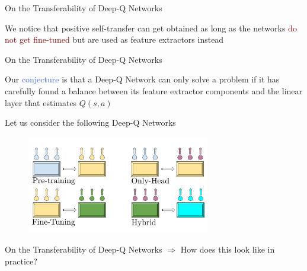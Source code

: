\documentclass{beamer}
\begin{document}
\begin{frame}{On the Transferability of Deep-Q Networks}
	
	We notice that positive self-transfer can get obtained as long as the networks \textcolor{Maroon}{do not get fine-tuned} but are used as feature extractors instead

	\begin{table}[ht!]
	\centering
	\caption{The area ratio scores obtained after performing self-transfer. We can see that if only the last linear layer is trained, then positive transfer is obtained on all \texttt{Catch} environments, whereas if the network is fine-tuned, positive transfer is (in part) only obtained on \texttt{Catch-v2}.}
	
	\label{tab:self_tl_area_ratio}
	\end{table}

\end{frame}

\begin{frame}{On the Transferability of Deep-Q Networks}

	\bigskip
	Our \textcolor{RoyalBlue}{conjecture} is that a Deep-Q Network can only solve a problem if it has carefully found a balance between its feature extractor components and the linear layer that estimates $Q(s,a)$

	\bigskip

	Let us consider the following Deep-Q Networks

	\begin{figure}[ht]
		\centering
		\includegraphics[width=8cm]{./figures/new_networks_2.pdf}
	\end{figure}

\end{frame}


\begin{frame}{On the Transferability of Deep-Q Networks}
	\bigskip
	$\Rightarrow$ How does this look like in practice?
	\bigskip
	

\end{frame}
\end{document}
